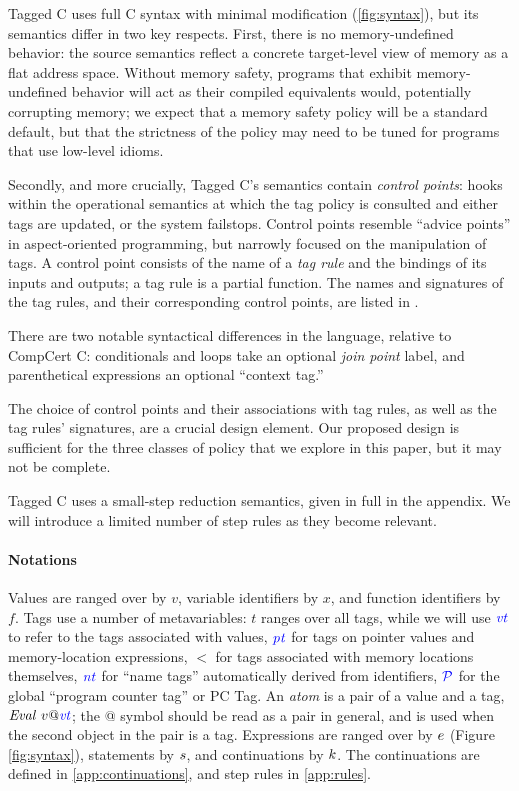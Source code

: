 \documentclass[acmsmall,review,anonymous]{acmart}\settopmatter{printfolios=true,printccs=false,printacmref=false}
\begin{document}
Tagged C uses full C syntax with minimal modification (\cref{fig:syntax}), but its semantics differ in
two key respects. First, there is no memory-undefined behavior: the source semantics reflect a
concrete target-level view of memory as a flat address space. Without memory safety, programs
that exhibit memory-undefined behavior will act as their compiled equivalents would, potentially
corrupting memory; we expect that a memory safety policy will be a standard default, but that the
strictness of the policy may need to be tuned for programs that use low-level idioms.

Secondly, and more crucially, Tagged C's semantics contain {\em control points}: hooks within the
operational semantics at which the tag policy is consulted and either tags are updated, or the system
failstops. Control points resemble ``advice points'' in aspect-oriented programming, but narrowly
focused on the manipulation of tags. A control point consists of the name of a {\em tag rule}
and the bindings of its inputs and outputs; a tag rule is a partial function. The names and
signatures of the tag rules, and their corresponding control points, are listed in .

There are two notable syntactical differences in the language, relative to CompCert C:
conditionals and loops take an optional {\em join point} label, and parenthetical expressions
an optional ``context tag.''

The choice of control points and their associations with tag rules, as well as the tag rules'
signatures, are a crucial design element. Our proposed design is sufficient for the three classes of
policy that we explore in this paper, but it may not be complete.

Tagged C uses a small-step reduction semantics, given in full in the appendix. We will introduce
a limited number of step rules as they become relevant.

\paragraph{Notations}
\label{sec:semantics}

Values are ranged over by \(v\), variable identifiers by \(x\), and function identifiers by \(f\).
Tags use a number of metavariables: \(t\) ranges over all tags, while we will use
\(\mathit{\color{blue} vt}\) to refer to the tags associated with values, \(\mathit{\color{blue} pt}\) for tags on pointer values
and memory-location expressions, \(\lt\) for tags associated with memory locations themselves,
\(\mathit{\color{blue} nt}\) for ``name tags'' automatically derived from identifiers, \(\mathcal{\color{blue} P}\) for the
global ``program counter tag'' or PC Tag.
An {\it atom} is a pair of a value and a tag, \(\mathit{Eval} ~ v@\mathit{\color{blue} vt}\); the @ symbol should be read
as a pair in general, and is used when the second object in the pair is a tag.
Expressions are ranged over by \(e\) (Figure \ref{fig:syntax}),
statements by \(s\), and continuations by \(k\).
The continuations are defined in \cref{app:continuations}, and step rules in \cref{app:rules}.
\end{document}
